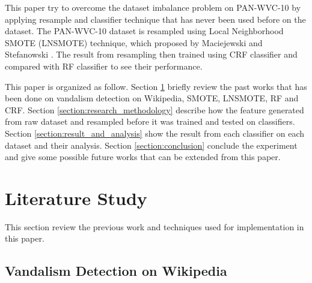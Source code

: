 \documentclass[conference,compsoc,a4paper,twocolumn,final]{IEEEtran}
\begin{document}
This paper try to overcome the dataset imbalance problem on PAN-WVC-10 by
applying resample and classifier technique that has never been used before on
the dataset.
The PAN-WVC-10 dataset is resampled using Local Neighborhood SMOTE (LNSMOTE)
technique,
which proposed by Maciejewski and Stefanowski
\cite{maciejewski2011local}.
The result from resampling then trained using CRF classifier and compared with
RF classifier to see their performance.

This paper is organized as follow.
Section \ref{section:literature_study} briefly review the past works that has
been done on vandalism detection on Wikipedia, SMOTE, LNSMOTE, RF and CRF.
Section \ref{section:research_methodology} describe how the feature generated
from raw dataset and resampled before it was trained and tested on classifiers.
Section \ref{section:result_and_analysis} show the result from each classifier
on each dataset and their analysis.
Section \ref{section:conclusion} conclude the experiment and
give some possible future works that can be extended from this paper.


\section{Literature Study}
\label{section:literature_study}

This section review the previous work and techniques used for implementation in
this paper.

\subsection{Vandalism Detection on Wikipedia}
\end{document}
